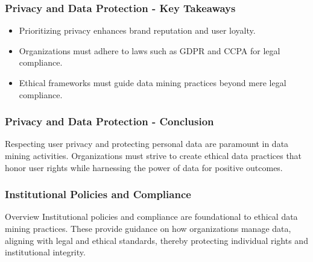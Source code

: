 \documentclass[aspectratio=169]{beamer}
\begin{document}
\begin{frame}[fragile]
    \frametitle{Privacy and Data Protection - Key Takeaways}
    \begin{itemize}
        \item Prioritizing privacy enhances brand reputation and user loyalty.
        \item Organizations must adhere to laws such as GDPR and CCPA for legal compliance.
        \item Ethical frameworks must guide data mining practices beyond mere legal compliance.
    \end{itemize}
\end{frame}

\begin{frame}[fragile]
    \frametitle{Privacy and Data Protection - Conclusion}
    Respecting user privacy and protecting personal data are paramount in data mining activities. Organizations must strive to create ethical data practices that honor user rights while harnessing the power of data for positive outcomes.
\end{frame}

\begin{frame}[fragile]
    \frametitle{Institutional Policies and Compliance}
    \begin{block}{Overview}
        Institutional policies and compliance are foundational to ethical data mining practices. These provide guidance on how organizations manage data, aligning with legal and ethical standards, thereby protecting individual rights and institutional integrity.
    \end{block}
\end{frame}
\end{document}
